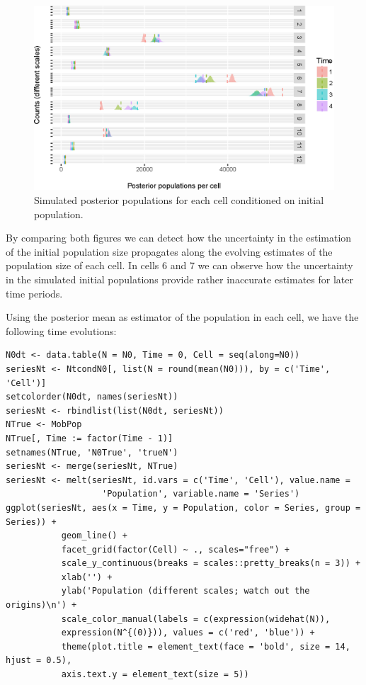 \documentclass[12pt, a4paper]{article}
\begin{document}
\begin{figure}
	\centering
	\includegraphics[scale=0.85]{time2.eps}
	\caption{Simulated posterior populations for each cell conditioned on initial population.}
	\label{time2} 	
\end{figure}

By comparing both figures we can detect how the uncertainty in the estimation of the initial population 
size propagates along the evolving estimates of the population size of each cell. In cells 6 and 7 we can 
observe how the uncertainty in the simulated initial populations provide rather inaccurate estimates for later time periods. 

Using the posterior mean as estimator of the population in each cell, we have the following time evolutions:

\begin{verbatim}
N0dt <- data.table(N = N0, Time = 0, Cell = seq(along=N0))
seriesNt <- NtcondN0[, list(N = round(mean(N0))), by = c('Time', 'Cell')]
setcolorder(N0dt, names(seriesNt))
seriesNt <- rbindlist(list(N0dt, seriesNt))
NTrue <- MobPop
NTrue[, Time := factor(Time - 1)]
setnames(NTrue, 'N0True', 'trueN')
seriesNt <- merge(seriesNt, NTrue)
seriesNt <- melt(seriesNt, id.vars = c('Time', 'Cell'), value.name = 
                   'Population', variable.name = 'Series')
ggplot(seriesNt, aes(x = Time, y = Population, color = Series, group = Series)) + 
           geom_line() + 
           facet_grid(factor(Cell) ~ ., scales="free") +
           scale_y_continuous(breaks = scales::pretty_breaks(n = 3)) +
           xlab('') + 
           ylab('Population (different scales; watch out the origins)\n') +
           scale_color_manual(labels = c(expression(widehat(N)), 
           expression(N^{(0)})), values = c('red', 'blue')) +
           theme(plot.title = element_text(face = 'bold', size = 14, hjust = 0.5), 
           axis.text.y = element_text(size = 5))
\end{verbatim}
\end{document}
